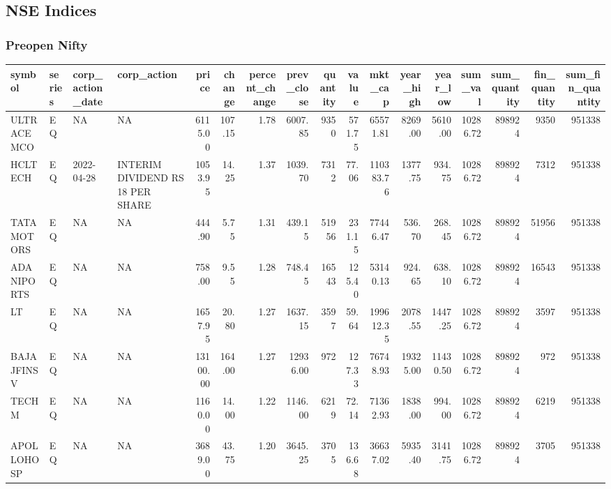 \documentclass[
]{article}
\begin{document}
\hypertarget{nse-indices}{%
\subsection{\texorpdfstring{ NSE
Indices}{ NSE Indices}}\label{nse-indices}}

\hypertarget{preopen-nifty}{%
\subsubsection{Preopen Nifty}\label{preopen-nifty}}

\begin{table}
\centering\begingroup\fontsize{12}{14}\selectfont

\begin{tabular}{l|l|l|l|r|r|r|r|r|r|r|r|r|r|r|r|r}
\hline
symbol & series & corp\_action\_date & corp\_action & price & change & percent\_change & prev\_close & quantity & value & mkt\_cap & year\_high & year\_low & sum\_val & sum\_quantity & fin\_quantity & sum\_fin\_quantity\\
\hline
ULTRACEMCO & EQ & NA & NA & 6115.00 & 107.15 & 1.78 & 6007.85 & 9350 & 571.75 & 65571.81 & 8269.00 & 5610.00 & 10286.72 & 898924 & 9350 & 951338\\
\hline
HCLTECH & EQ & 2022-04-28 & INTERIM DIVIDEND RS 18 PER SHARE & 1053.95 & 14.25 & 1.37 & 1039.70 & 7312 & 77.06 & 110383.76 & 1377.75 & 934.75 & 10286.72 & 898924 & 7312 & 951338\\
\hline
TATAMOTORS & EQ & NA & NA & 444.90 & 5.75 & 1.31 & 439.15 & 51956 & 231.15 & 77446.47 & 536.70 & 268.45 & 10286.72 & 898924 & 51956 & 951338\\
\hline
ADANIPORTS & EQ & NA & NA & 758.00 & 9.55 & 1.28 & 748.45 & 16543 & 125.40 & 53140.13 & 924.65 & 638.10 & 10286.72 & 898924 & 16543 & 951338\\
\hline
LT & EQ & NA & NA & 1657.95 & 20.80 & 1.27 & 1637.15 & 3597 & 59.64 & 199612.35 & 2078.55 & 1447.25 & 10286.72 & 898924 & 3597 & 951338\\
\hline
BAJAJFINSV & EQ & NA & NA & 13100.00 & 164.00 & 1.27 & 12936.00 & 972 & 127.33 & 76748.93 & 19325.00 & 11430.50 & 10286.72 & 898924 & 972 & 951338\\
\hline
TECHM & EQ & NA & NA & 1160.00 & 14.00 & 1.22 & 1146.00 & 6219 & 72.14 & 71362.93 & 1838.00 & 994.00 & 10286.72 & 898924 & 6219 & 951338\\
\hline
APOLLOHOSP & EQ & NA & NA & 3689.00 & 43.75 & 1.20 & 3645.25 & 3705 & 136.68 & 36637.02 & 5935.40 & 3141.75 & 10286.72 & 898924 & 3705 & 951338\\

\end{tabular}
\end{table}
\end{document}
